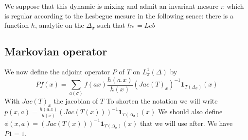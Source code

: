 \color{green}
We suppose that this dynamic is mixing and admit an invariant mesure $\pi$ which is regular according to the Lesbegue mesure in the following sence: there is a function $h$, analytic on the $\Delta_\sigma$ such that $h \pi= Leb$
\color{black}

\subsection{Markovian operator}
We now define the adjoint operator $P$ of $T$ on $L^1_{\pi}(\Delta)$ by \[
Pf(x)=\sum_{a(\sigma)} f(a x)\frac{h(a.x)}{h(x)}(Jac(T)_x)^{-1} \mathbf{1} _{T(\Delta_\sigma)}(x)
\]
With $Jac(T)_x$ the jacobian of $T$\newline
To shorten the notation we will write $p(x,a)=\frac{h(a.x)}{h(x)}(Jac(T(x)))^{-1} \mathbf{1}_{T(\Delta_\sigma)}(x)$\newline
We should also define $\phi(x,a)=(Jac(T(x)))^{-1} \mathbf{1}_{T(\Delta_\sigma)}(x)$ that we will use after. \newline
We have $P1=1$.
